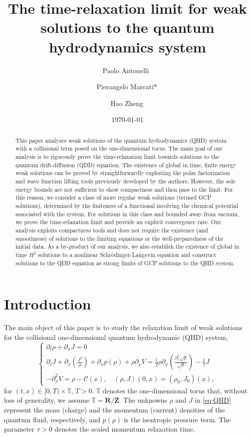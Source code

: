 \documentclass[leqno]{amsart}
\date\today
\title[QHD system with damping and relaxation-time limit]{The time-relaxation limit for weak solutions to the quantum hydrodynamics system}
\author[P. Antonelli]{Paolo Antonelli \,\orcidlink{0000-0001-8211-8296}}
\author[P. Marcati]{Pierangelo Marcati*\,\orcidlink{0000-0001-6528-6562}}
\author[H. Zheng]{Hao Zheng\,\orcidlink{0000-0002-7098-7731}}
\theoremstyle{plain}
\theoremstyle{definition}
\theoremstyle{remark}
\theoremstyle{plain}
\theoremstyle{plain}
\def\R{{\mathbf R}}%
\def\T{{\mathbb T}}%
\def\Z{{\mathbf Z}}%
\def\d{{\partial}}
\numberwithin{equation}{section}
\begin{document}
\begin{abstract}
This paper analyzes weak solutions of the quantum hydrodynamics (QHD) system with 
a collisional term posed on the one-dimensional torus. The main goal of our analysis is to rigorously prove the time-relaxation limit towards solutions to the quantum drift-diffusion (QDD) equation.
\newline
The existence of global in time, finite energy weak solutions can be proved by straightforwardly exploiting the polar factorization and wave function lifting tools previously developed by the authors. However, the sole energy bounds are not sufficient to show compactness and then pass to the limit.
\newline
For this reason, we consider a class of more regular weak solutions (termed GCP solutions), determined by the finiteness of a functional involving the chemical potential associated with the system. For solutions in this class and bounded away from vacuum, we prove the time-relaxation limit and provide an explicit convergence rate.
\newline
Our analysis exploits compactness tools and does not require the existence (and smoothness) of solutions to the limiting equations or the well-preparedness of the initial data.
\newline
As a by-product of our analysis, we also establish the existence of global in time $H^2$ solutions to a nonlinear Schr\"odinger-Langevin equation and construct solutions to the QDD equation as strong limits of GCP solutions to the QHD system.
\end{abstract}
\maketitle
\section{Introduction}\label{sect:intro}

The main object of this paper is to study the relaxation limit of weak solutions for the collisional one-dimensional quantum hydrodynamic (QHD) system,
\begin{equation}\label{eq:QHD}
\begin{cases}
\d_{t}\rho+\d_xJ=0\\
\d_{t}J+\d_x\left(\frac{J^2}{\rho}\right)+\d_x p(\rho)+\rho\d_x V=\frac{1}{2}\rho\d_x\left(\frac{\d_x^2\sqrt\rho}{\sqrt\rho}\right)-\frac{1}{\tau}J\\
-\d_x^2V=\rho-\mathcal{C}(x),\quad (\rho,J)(0,x)=(\rho_0,J_0)(x),
\end{cases}
\end{equation}
for $(t,x)\in[0,T)\times\T$, $T>0$. $\T$ denotes the one-dimensional torus that, without loss of generality, we assume $\T=\R/\Z$. The unknowns $\rho$ and $J$ in \eqref{eq:QHD} represent the mass (charge) and the momentum (current) densities of the quantum fluid, respectively, and $p(\rho)$ is the isentropic pressure term. The parameter $\tau>0$ denotes the scaled momentum relaxation time.
\end{document}
